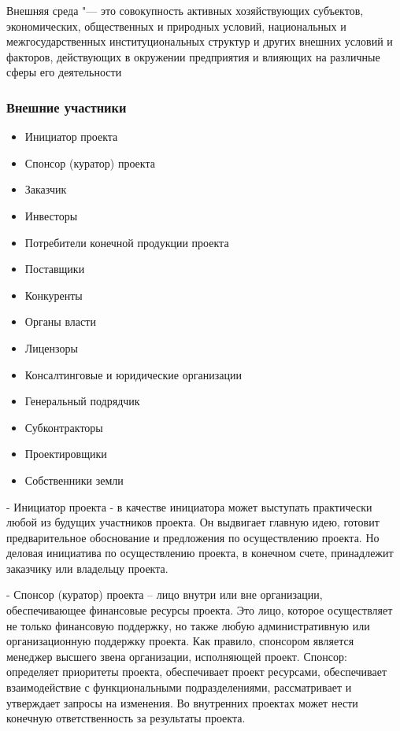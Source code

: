 \documentclass{../industrial-development}
\begin{document}
\lecturenotes Внешняя среда "--- это совокупность активных хозяйствующих субъектов, экономических, общественных и природных условий, национальных и межгосударственных институциональных структур и других внешних условий и факторов, действующих в окружении предприятия и влияющих на различные сферы его деятельности

\begin{frame} \frametitle{Внешние участники}
	\begin{itemize}
		\item Инициатор проекта
		\item Спонсор (куратор) проекта
		\item Заказчик
		\item Инвесторы
		\item Потребители конечной продукции проекта
		\item Поставщики
		\item Конкуренты
		\item Органы власти
		\item Лицензоры
		\item Консалтинговые и юридические организации 
		\item Генеральный подрядчик
		\item Субконтракторы
		\item Проектировщики
		\item Собственники земли
	\end{itemize}
\end{frame}

\lecturenotes
- Инициатор проекта - в качестве инициатора может выступать практически любой из будущих участников проекта. Он выдвигает главную идею, готовит предварительное обоснование и предложения по осуществлению проекта. Но деловая инициатива по осуществлению проекта, в конечном счете, принадлежит заказчику или владельцу проекта.

- Спонсор (куратор) проекта – лицо внутри или вне организации, обеспечивающее финансовые ресурсы проекта. Это лицо, которое осуществляет не только финансовую поддержку, но также любую административную или организационную поддержку проекта. Как правило, спонсором является менеджер высшего звена организации, исполняющей проект. Спонсор: определяет приоритеты проекта, обеспечивает проект ресурсами, обеспечивает взаимодействие с функциональными подразделениями, рассматривает и утверждает запросы на изменения. Во внутренних проектах может нести конечную ответственность за результаты проекта.
\end{document}
